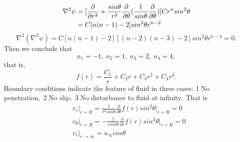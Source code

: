 \documentclass{report}
\begin{document}
\begin{equation}
\begin{aligned}
    \nabla^2\psi &= [\frac{\partial}{\partial r^2} + \frac{sin\theta}{r^2} \frac{\partial}{\partial \theta}(\frac{1}{sin\theta} \frac{\partial}{\partial \theta})]Cr^{n}sin^2\theta \\ 
    & = C[n(n-1) -2]sin^2\theta r^{n-2} \notag
\end{aligned}
\end{equation}
\begin{equation}
    \nabla^2(\nabla^2 \psi) = C[n(n-1)-2][(n-2)(n-3) -2]sin^2\theta r^{n-4} = 0.
\end{equation}
Then we conclude that
\begin{equation}
    n_1 = -1,~n_2 = 1,~ n_3 = 2,~n_4 = 4,
\end{equation}
that is,
\begin{equation}
    f(r) = \frac{C_1}{r} + C_2r + C_3r^2 + C_4r^4.
\end{equation}
\indent Boundary conditions indicate the feature of fluid in three cases: 
\textcircled{\small1}No penetration,~\textcircled{\small2}No slip,~\textcircled{\small3}No disturbance to fluid at infinity.~That is
\begin{equation}
\begin{aligned}
    &v_r \bigg|_{r = R} = \frac{1}{r^2sin\theta}\frac{\partial}{\partial \theta} f(r)sin^2\theta \bigg|_{r = R} = 0 \\ 
    &v_{\theta} \bigg|_{r = R} = -\frac{1}{rsin\theta}\frac{\partial}{\partial r}f(r)sin^2\theta \bigg|_{r = R} = 0 \\
    &v_r \bigg|_{r \rightarrow \infty} = u_{\infty}cos\theta
\end{aligned}
\end{equation}
\clearpage
\end{document}
